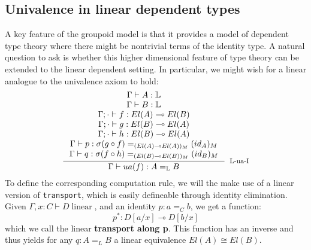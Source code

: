 \documentclass[a4paper,english]{lipics-v2018}
\DeclareMathOperator{\linear}{\text{ linear}}
\begin{document}
\subsection{Univalence in linear dependent types}\label{highermodel}
A key feature of the groupoid model is that it provides a model of dependent type theory where there might be nontrivial terms of the identity type. A natural question to ask is whether this higher dimensional feature of type theory can be extended to the linear dependent setting.
In particular, we might wish for a linear analogue to the univalence axiom to hold:
\[
  \inference{
    \Gamma \vdash A : \mathbb{L}\\
    \Gamma \vdash B : \mathbb{L}\\
    \Gamma; \cdot \vdash f : El(A) \multimap El(B)\\
    \Gamma; \cdot \vdash g : El(B) \multimap El(A)\\
    \Gamma; \cdot \vdash h : El(B) \multimap El(A)\\
    \Gamma \vdash p : \sigma(g \circ f)  =_{(El(A) \multimap El(A))_M} (id_A)_M\\
    \Gamma \vdash q : \sigma(f \circ h) =_{(El(B) \multimap El(B))_M} (id_B)_M\\
    }{\Gamma \vdash ua(f) : A =_{\mathbb{L}} B}[L-ua-I]
  \]
  To define the corresponding computation rule, we will the make use of a linear version of \texttt{transport}, which is easily defineable through identity elimination. Given $\Gamma, x : C \vdash D \linear$, and an identity $p : a =_C b$, we get a function:
\[
  p^* : D[a/x] \multimap D[b/x]
  \]
  which we call the linear \textbf{transport along p}.
  This function has an inverse and thus yields for any $q : A =_L B$ a linear equivalence $El(A) \cong El(B)$.
  
\end{document}

